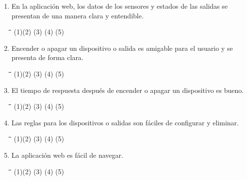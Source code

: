 \begin{appendix}
\begin{enumerate}
	\item En la aplicación web, los datos de los sensores y estados de las salidas se presentan de una manera clara y entendible.

\begin{tabbing}
	\hspace{2cm}\=\hspace{2cm}\=\hspace{2cm}\=\hspace{2cm}\=\kill
	(1)\>(2)  \>(3)  \>(4)  \>(5) 
\end{tabbing} 
	
	\item Encender o apagar un dispositivo o salida es amigable para el usuario y se presenta de forma clara.
	
\begin{tabbing}
	\hspace{2cm}\=\hspace{2cm}\=\hspace{2cm}\=\hspace{2cm}\=\kill
	(1)\>(2)  \>(3)  \>(4)  \>(5) 
\end{tabbing} 

	\item El tiempo de respuesta después de encender o apagar un dispositivo es bueno.

	\begin{tabbing}
		\hspace{2cm}\=\hspace{2cm}\=\hspace{2cm}\=\hspace{2cm}\=\kill
		(1)\>(2)  \>(3)  \>(4)  \>(5) 
	\end{tabbing} 

	\item Las reglas para los dispositivos o salidas son fáciles de configurar y eliminar.

\begin{tabbing}
	\hspace{2cm}\=\hspace{2cm}\=\hspace{2cm}\=\hspace{2cm}\=\kill
	(1)\>(2)  \>(3)  \>(4)  \>(5) 
\end{tabbing} 

	\item La aplicación web es fácil de navegar.

\begin{tabbing}
	\hspace{2cm}\=\hspace{2cm}\=\hspace{2cm}\=\hspace{2cm}\=\kill
	(1)\>(2)  \>(3)  \>(4)  \>(5) 
\end{tabbing} 


\end{enumerate}
\end{appendix}
